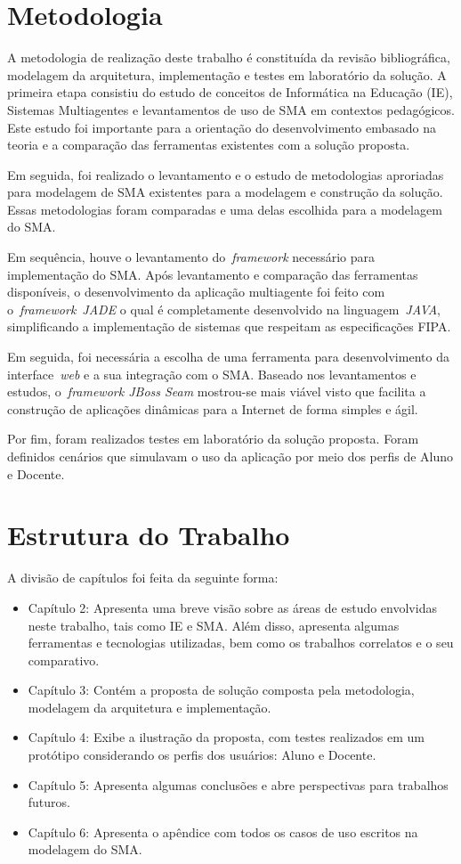 \section{Metodologia}

A metodologia de realização deste trabalho é constituída da revisão bibliográfica, modelagem da arquitetura, implementação e testes em laboratório da solução. A primeira etapa consistiu do estudo de conceitos de Informática na Educação (IE), Sistemas Multiagentes e levantamentos de uso de SMA em contextos pedagógicos. Este estudo foi importante para a orientação do desenvolvimento embasado na teoria e a comparação das ferramentas existentes com a solução proposta.

Em seguida, foi realizado o levantamento e o estudo de metodologias aproriadas para modelagem de SMA existentes para a modelagem e construção da solução. Essas metodologias foram comparadas e uma delas escolhida para a modelagem do SMA.

Em sequência, houve o levantamento do~\emph{framework} necessário para implementação do SMA. Após levantamento e comparação das ferramentas disponíveis, o desenvolvimento da aplicação multiagente foi feito com o~\emph{framework}~\emph{JADE} o qual é completamente desenvolvido na linguagem~\emph{JAVA}, simplificando a implementação de sistemas que respeitam as especificações FIPA. 

Em seguida, foi necessária a escolha de uma ferramenta para desenvolvimento da interface~\emph{web} e a sua integração com o SMA. Baseado nos levantamentos e estudos, o~\emph{framework JBoss Seam} mostrou-se mais viável visto que facilita a construção de aplicações dinâmicas para a Internet de forma simples e ágil.

Por fim, foram realizados testes em laboratório da solução proposta. Foram definidos cenários que simulavam o uso da aplicação por meio dos perfis de Aluno e Docente.

\section{Estrutura do Trabalho}
A divisão de capítulos foi feita da seguinte forma:
\begin{itemize}
	\item Capítulo 2: Apresenta uma breve visão sobre as áreas de estudo envolvidas neste trabalho, tais como IE e SMA. Além disso, apresenta algumas ferramentas e tecnologias utilizadas, bem como os trabalhos correlatos e o seu comparativo.
	\item Capítulo 3: Contém a proposta de solução composta pela metodologia, modelagem da arquitetura e implementação.
	\item Capítulo 4: Exibe a ilustração da proposta, com testes realizados em um protótipo considerando os perfis dos usuários: Aluno e Docente.
	\item Capítulo 5: Apresenta algumas conclusões e abre perspectivas para trabalhos futuros.
	\item Capítulo 6: Apresenta o apêndice com todos os casos de uso escritos na modelagem do SMA.
\end{itemize}
